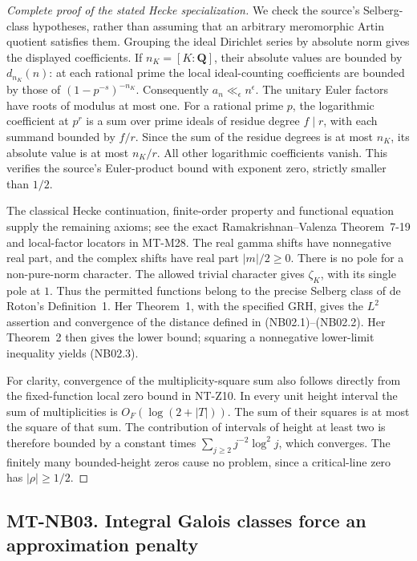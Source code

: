 \begin{proof}[Complete proof of the stated Hecke specialization]
We check the source's Selberg-class hypotheses, rather than
assuming that an arbitrary meromorphic Artin quotient satisfies
them. Grouping the ideal Dirichlet series by absolute norm gives
the displayed coefficients. If $n_K=[K:\mathbf Q]$, their
absolute values are bounded by $d_{n_K}(n)$: at each rational
prime the local ideal-counting coefficients are bounded by those
of $(1-p^{-s})^{-n_K}$. Consequently $a_n\ll_\epsilon n^\epsilon$.
The unitary Euler factors have roots of modulus at most one.
For a rational prime $p$, the logarithmic coefficient at $p^r$
is a sum over prime ideals of residue degree $f\mid r$,
with each summand bounded by $f/r$. Since the sum of the
residue degrees is at most $n_K$, its absolute value is at
most $n_K/r$. All other logarithmic coefficients vanish.
This verifies the source's Euler-product bound with exponent
zero, strictly smaller than $1/2$.

The classical Hecke continuation, finite-order property and
functional equation supply the remaining axioms; see the exact
Ramakrishnan--Valenza Theorem~7-19 and local-factor locators
in MT-M28. The real gamma shifts have nonnegative real part,
and the complex shifts have real part $|m|/2\ge0$.
There is no pole for a non-pure-norm character. The allowed
trivial character gives $\zeta_K$, with its single pole at $1$.
Thus the permitted functions belong to the precise Selberg
class of de Roton's Definition~1. Her Theorem~1, with the
specified GRH, gives the $L^2$ assertion and convergence of
the distance defined in (NB02.1)--(NB02.2). Her Theorem~2
then gives the lower bound; squaring a nonnegative lower-limit
inequality yields (NB02.3).

For clarity, convergence of the multiplicity-square sum also
follows directly from the fixed-function local zero bound in
NT-Z10. In every unit height interval the sum of multiplicities
is $O_F(\log(2+|T|))$. The sum of their squares is at most
the square of that sum. The contribution of intervals of
height at least two is therefore bounded by a constant times
$\sum_{j\ge2}j^{-2}\log^2j$, which converges. The finitely many
bounded-height zeros cause no problem, since a critical-line
zero has $|\rho|\ge1/2$.
\end{proof}

\subsection*{MT-NB03. Integral Galois classes force an approximation penalty}


